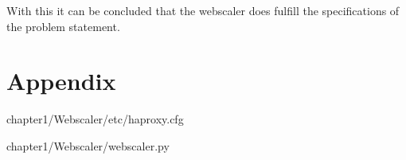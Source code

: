 With this it can be concluded that the webscaler does fulfill the
specifications of the problem statement.

\section{Appendix}
\thispagestyle{empty}
\begin{center}

{chapter1/Webscaler/etc/haproxy.cfg}



{chapter1/Webscaler/webscaler.py}







\end{center}
\restoregeometry
